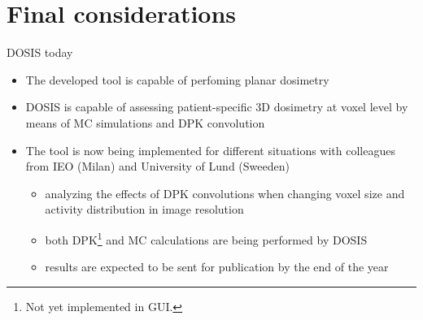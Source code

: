 \documentclass[ignorenonframetext,]{beamer}
\providecommand{\tightlist}{%
  \setlength{\itemsep}{0pt}\setlength{\parskip}{0pt}}
\begin{document}
\hypertarget{final-considerations}{%
\section{Final considerations}\label{final-considerations}}

\begin{frame}{DOSIS today}
\protect\hypertarget{dosis-today}{}

\begin{itemize}
\item
  The developed tool is capable of perfoming planar dosimetry
\item
  DOSIS is capable of assessing patient-specific 3D dosimetry at voxel
  level by means of MC simulations and DPK convolution
\item
  The tool is now being implemented for different situations with
  colleagues from IEO (Milan) and University of Lund (Sweeden)

  \begin{itemize}
  \tightlist
  \item
    analyzing the effects of DPK convolutions when changing voxel size
    and activity distribution in image resolution
  \item
    both DPK\footnote{Not yet implemented in GUI.} and MC calculations
    are being performed by DOSIS
  \item
    results are expected to be sent for publication by the end of the
    year
  \end{itemize}
\end{itemize}

\end{frame}
\end{document}
